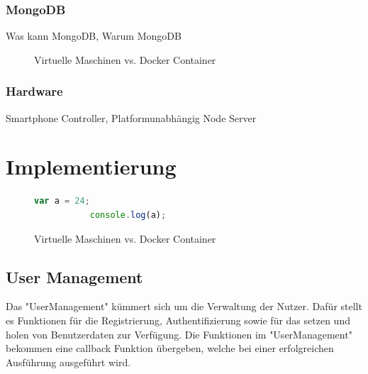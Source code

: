 \documentclass[a4paper]{spie}  %
\begin{document}
\subsubsection{MongoDB}
Was kann MongoDB, Warum MongoDB
\begin{figure}[h!]
	\centering
		\caption{Virtuelle Maschinen vs. Docker Container\cite{dockercontainer}}
		\label{fig:dockerVM}
\end{figure}
\subsubsection{Hardware}
Smartphone Controller, Platformunabhängig Node Server

%
%

\section{Implementierung}

\begin{figure}[h!]
	\centering
        \begin{lstlisting}[language=JavaScript,caption=Javascript Example]
           var a = 24;
           console.log(a);
        \end{lstlisting}
		\caption{Virtuelle Maschinen vs. Docker Container\cite{dockercontainer}}
		\label{fig:dockerVM}
\end{figure}

\subsection{User Management} %
Das "UserManagement" kümmert sich um die Verwaltung der Nutzer. Dafür stellt es Funktionen für die Registrierung, Authentifizierung sowie für das setzen und holen von Benutzerdaten zur Verfügung. Die Funktionen im "UserManagement" bekommen eine callback Funktion übergeben, welche bei einer erfolgreichen Ausführung ausgeführt wird.
\end{document}
